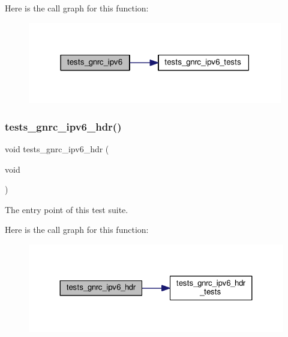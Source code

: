 Here is the call graph for this function\+:
\nopagebreak
\begin{figure}[H]
\begin{center}
\leavevmode
\includegraphics[width=315pt]{group__unittests_gaec5ea3d48a03bd5f1f2194f33ce38010_cgraph}
\end{center}
\end{figure}
\mbox{\label{group__unittests_ga5f40f856d40dbcd2b69c5176f7038062}} 
\subsubsection{\texorpdfstring{tests\+\_\+gnrc\+\_\+ipv6\+\_\+hdr()}{tests\_gnrc\_ipv6\_hdr()}}
{\footnotesize\ttfamily void tests\+\_\+gnrc\+\_\+ipv6\+\_\+hdr (\begin{DoxyParamCaption}\item[{void}]{ }\end{DoxyParamCaption})}



The entry point of this test suite. 

Here is the call graph for this function\+:
\nopagebreak
\begin{figure}[H]
\begin{center}
\leavevmode
\includegraphics[width=324pt]{group__unittests_ga5f40f856d40dbcd2b69c5176f7038062_cgraph}
\end{center}
\end{figure}
\mbox{\label{group__unittests_ga94ab40380fa6a4f0472a693ef6b5a9c3}} 
